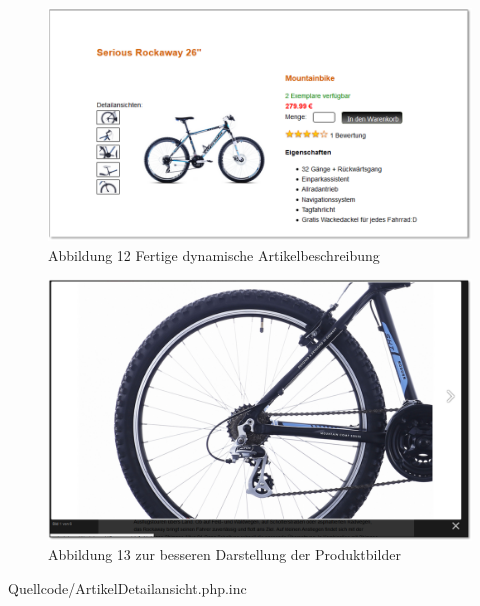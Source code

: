 \begin{figure}[H]
\begin{center}
\includegraphics[width=150mm]{Bilder/Abbildung12-DynamischeDetailierteArtikelbeschreibungFertig.png}
\end{center}
\caption{Abbildung 12 Fertige dynamische Artikelbeschreibung}
\label{Abbildung12-Fertige dynamische Artikelbeschreibung}
\end{figure}

\begin{figure}[H]
\begin{center}
\includegraphics[width=150mm]{Bilder/Abbildung13-Lightbox.png}
\end{center}
\caption{Abbildung 13 \grqq{} zur besseren Darstellung der Produktbilder}
\label{Abbildung13-"Lightbox" zur besseren Darstellung der Produktbilder}
\end{figure}

\newpage
\begin{center}
	\begin{lstinputlisting}[language=PHP, caption={Auszug aus der Seite Artikel Detailansicht}]
		{Quellcode/ArtikelDetailansicht.php.inc}
	\end{lstinputlisting}
\end{center}

